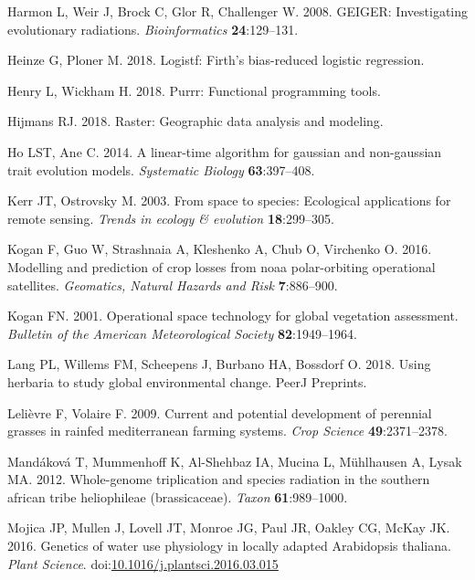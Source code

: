 \documentclass[man,floatsintext]{apa6}
\theoremstyle{definition}
\theoremstyle{definition}
\theoremstyle{definition}
\theoremstyle{remark}
\begin{document}
\leavevmode\hypertarget{ref-R-geiger_d}{}%
Harmon L, Weir J, Brock C, Glor R, Challenger W. 2008. GEIGER:
Investigating evolutionary radiations. \emph{Bioinformatics}
\textbf{24}:129--131.

\leavevmode\hypertarget{ref-R-logistf}{}%
Heinze G, Ploner M. 2018. Logistf: Firth's bias-reduced logistic
regression.

\leavevmode\hypertarget{ref-R-purrr}{}%
Henry L, Wickham H. 2018. Purrr: Functional programming tools.

\leavevmode\hypertarget{ref-R-raster}{}%
Hijmans RJ. 2018. Raster: Geographic data analysis and modeling.

\leavevmode\hypertarget{ref-R-phylolm}{}%
Ho LST, Ane C. 2014. A linear-time algorithm for gaussian and
non-gaussian trait evolution models. \emph{Systematic Biology}
\textbf{63}:397--408.

\leavevmode\hypertarget{ref-kerr2003space}{}%
Kerr JT, Ostrovsky M. 2003. From space to species: Ecological
applications for remote sensing. \emph{Trends in ecology \& evolution}
\textbf{18}:299--305.

\leavevmode\hypertarget{ref-kogan2016modelling}{}%
Kogan F, Guo W, Strashnaia A, Kleshenko A, Chub O, Virchenko O. 2016.
Modelling and prediction of crop losses from noaa polar-orbiting
operational satellites. \emph{Geomatics, Natural Hazards and Risk}
\textbf{7}:886--900.

\leavevmode\hypertarget{ref-kogan2001operational}{}%
Kogan FN. 2001. Operational space technology for global vegetation
assessment. \emph{Bulletin of the American Meteorological Society}
\textbf{82}:1949--1964.

\leavevmode\hypertarget{ref-lang2018using}{}%
Lang PL, Willems FM, Scheepens J, Burbano HA, Bossdorf O. 2018. Using
herbaria to study global environmental change. PeerJ Preprints.

\leavevmode\hypertarget{ref-lelievre2009current}{}%
Lelièvre F, Volaire F. 2009. Current and potential development of
perennial grasses in rainfed mediterranean farming systems. \emph{Crop
Science} \textbf{49}:2371--2378.

\leavevmode\hypertarget{ref-mandakova2012whole}{}%
Mandáková T, Mummenhoff K, Al-Shehbaz IA, Mucina L, Mühlhausen A, Lysak
MA. 2012. Whole-genome triplication and species radiation in the
southern african tribe heliophileae (brassicaceae). \emph{Taxon}
\textbf{61}:989--1000.

\leavevmode\hypertarget{ref-Mojica2016}{}%
Mojica JP, Mullen J, Lovell JT, Monroe JG, Paul JR, Oakley CG, McKay JK.
2016. Genetics of water use physiology in locally adapted Arabidopsis
thaliana. \emph{Plant Science}.
doi:\href{https://doi.org/10.1016/j.plantsci.2016.03.015}{10.1016/j.plantsci.2016.03.015}
\end{document}
